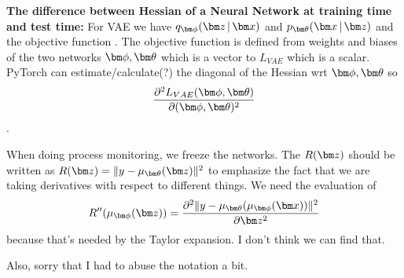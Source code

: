 \documentclass[journal, peerreview]{IEEEtran}
\begin{document}
 \textbf{The difference between Hessian of a Neural Network at training time and test time:}
  For VAE we have $\encoding$ and $\decoding$ and the objective function .
 The objective function is defined from weights and biases of the two networks $\mbphi,\mbtheta$ which is a vector to $L_{VAE}$ which is a scalar. PyTorch can estimate/calculate(?) the diagonal of the Hessian wrt $\mbphi,\mbtheta$ so 
 $$\frac{\partial^{2}L_{VAE}(\mbphi,\mbtheta)}{\partial(\mbphi,\mbtheta)^{2}}$$.
 
 When doing process monitoring, we freeze the networks. The $R(\mbz)$ should be written as $R(\mbz) = \|y-\mu_{\mbtheta}(\mbz)\|^{2}$ to emphasize the fact that we are taking derivatives with respect to different things.
 We need the evaluation of 
 $$R''(\mu_{\mbphi}(\mbz)) = \frac{\partial^{2}\|y-\mu_{\mbtheta}(\mu_{\mbphi}(\mbx))\|^2}{\partial\mbz^{2}}$$ 
 because that's needed by the Taylor expansion. I don't think we can find that.
 
 Also, sorry that I had to abuse the notation a bit.
 
\end{document}
